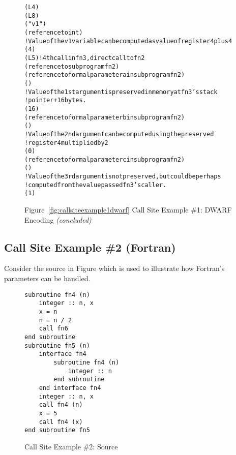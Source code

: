 \begin{figure}
\begin{dwflisting}
\begin{alltt}
\DWTAGlexicalblock
    \DWATlowpc(L4)
    \DWAThighpc(L8)
    \DWTAGvariable
        \DWATname("v1")
        \DWATtype(reference to int)
        ! Value of the v1 variable can be computed as value of register 4 plus 4
        \DWATlocation(\DWOPbregfour{} 4 \DWOPstackvalue)
    \DWTAGcallsite
        \DWATcallreturnpc(L5) ! 4th call in fn3, direct call to fn2
        \DWATcalltarget(reference to subprogram fn2)
        \DWTAGcallsiteparameter
            \DWATcallparameter(reference to formal parameter a in subprogram fn2)
            \DWATlocation(\DWOPregzero)
            ! Value of the 1st argument is preserved in memory at fn3's stack 
            !   pointer + 16 bytes.
            \DWATcallvalue(\DWOPbregthree{} 16 \DWOPderef)
        \DWTAGcallsiteparameter
            \DWATcallparameter(reference to formal parameter b in subprogram fn2)
            \DWATlocation(\DWOPregone)
            ! Value of the 2nd argument can be computed using the preserved 
            !   register 4 multiplied by 2
            \DWATcallvalue(\DWOPlittwo{} \DWOPregfour{} 0 \DWOPmul)
        \DWTAGcallsiteparameter
            \DWATcallparameter(reference to formal parameter c in subprogram fn2)
            \DWATlocation(\DWOPregtwo)
            ! Value of the 3rd argument is not preserved, but could be perhaps 
            ! computed from the value passed fn3's caller.
            \DWATcallvalue(\DWOPentryvalue{} 1 \DWOPregzero)
\end{alltt}
\end{dwflisting}
\begin{center}
\vspace{3mm}
Figure~\ref{fig:callsiteexample1dwarf} Call Site Example \#1: DWARF Encoding \textit{(concluded)}
\end{center}
\end{figure}

\clearpage
\subsection{Call Site Example \#2 (Fortran)}
Consider the  source in 
Figure 
which is used to illustrate how Fortran's 
parameters can be handled.

\begin{figure}[h]
\begin{lstlisting}
subroutine fn4 (n)
    integer :: n, x
    x = n
    n = n / 2
    call fn6
end subroutine
subroutine fn5 (n)
    interface fn4
        subroutine fn4 (n)
            integer :: n
        end subroutine
    end interface fn4
    integer :: n, x
    call fn4 (n)
    x = 5
    call fn4 (x)
end subroutine fn5
\end{lstlisting}
\caption{Call Site Example \#2: Source}
\label{fig:callsiteexample2source}
\end{figure}

